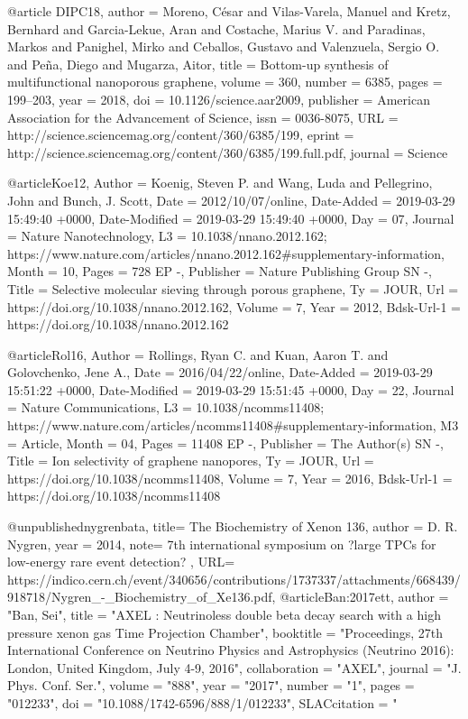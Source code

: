 @article {DIPC18,
	author = {Moreno, C{\'e}sar and Vilas-Varela, Manuel and Kretz, Bernhard and Garcia-Lekue, Aran and Costache, Marius V. and Paradinas, Markos and Panighel, Mirko and Ceballos, Gustavo and Valenzuela, Sergio O. and Pe{\~n}a, Diego and Mugarza, Aitor},
	title = {Bottom-up synthesis of multifunctional nanoporous graphene},
	volume = {360},
	number = {6385},
	pages = {199--203},
	year = {2018},
	doi = {10.1126/science.aar2009},
	publisher = {American Association for the Advancement of Science},
	issn = {0036-8075},
	URL = {http://science.sciencemag.org/content/360/6385/199},
	eprint = {http://science.sciencemag.org/content/360/6385/199.full.pdf},
	journal = {Science}
}



@article{Koe12,
	Author = {Koenig, Steven P. and Wang, Luda and Pellegrino, John and Bunch, J. Scott},
	Date = {2012/10/07/online},
	Date-Added = {2019-03-29 15:49:40 +0000},
	Date-Modified = {2019-03-29 15:49:40 +0000},
	Day = {07},
	Journal = {Nature Nanotechnology},
	L3 = {10.1038/nnano.2012.162; https://www.nature.com/articles/nnano.2012.162#supplementary-information},
	Month = {10},
	Pages = {728 EP  -},
	Publisher = {Nature Publishing Group SN  -},
	Title = {Selective molecular sieving through porous graphene},
	Ty = {JOUR},
	Url = {https://doi.org/10.1038/nnano.2012.162},
	Volume = {7},
	Year = {2012},
	Bdsk-Url-1 = {https://doi.org/10.1038/nnano.2012.162}
	}



@article{Rol16,
	Author = {Rollings, Ryan C. and Kuan, Aaron T. and Golovchenko, Jene A.},
	Date = {2016/04/22/online},
	Date-Added = {2019-03-29 15:51:22 +0000},
	Date-Modified = {2019-03-29 15:51:45 +0000},
	Day = {22},
	Journal = {Nature Communications},
	L3 = {10.1038/ncomms11408; https://www.nature.com/articles/ncomms11408#supplementary-information},
	M3 = {Article},
	Month = {04},
	Pages = {11408 EP  -},
	Publisher = {The Author(s) SN  -},
	Title = {Ion selectivity of graphene nanopores},
	Ty = {JOUR},
	Url = {https://doi.org/10.1038/ncomms11408},
	Volume = {7},
	Year = {2016},
	Bdsk-Url-1 = {https://doi.org/10.1038/ncomms11408}
	}


@unpublished{nygrenbata,
title= {The Biochemistry of Xenon 136},
author = {D. R. Nygren},
year = {2014},
note= {7th international symposium on ?large TPCs for low-energy rare event detection? },
URL= {https://indico.cern.ch/event/340656/contributions/1737337/attachments/668439/918718/Nygren_-_Biochemistry_of_Xe136.pdf},
}
@article{Ban:2017ett,
      author         = "Ban, Sei",
      title          = "{AXEL : Neutrinoless double beta decay search with a high
                        pressure xenon gas Time Projection Chamber}",
      booktitle      = "{Proceedings, 27th International Conference on Neutrino
                        Physics and Astrophysics (Neutrino 2016): London, United
                        Kingdom, July 4-9, 2016}",
      collaboration  = "AXEL",
      journal        = "J. Phys. Conf. Ser.",
      volume         = "888",
      year           = "2017",
      number         = "1",
      pages          = "012233",
      doi            = "10.1088/1742-6596/888/1/012233",
      SLACcitation   = "%
}


